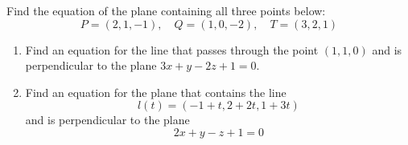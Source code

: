 \documentclass[openany]{book}
\begin{document}
\begin{prob}
    Find the equation of the plane containing all three points below:
    \begin{equation*}
        P=(2,1,-1), \quad Q=(1,0,-2), \quad T=(3,2,1)
    \end{equation*}
\end{prob}
\newpage
\begin{prob}
    \begin{enumerate}
        \item[(a)] Find an equation for the line that passes through the point $(1,1,0)$ and is perpendicular to the plane $3x+y-2z+1=0$.
        \item[(b)] Find an equation for the plane that contains the line 
        \begin{equation*}
            l(t)=(-1+t, 2+2t, 1+3t)
        \end{equation*}
        and is perpendicular to the plane 
        \begin{equation*}
            2x+y-z+1=0
        \end{equation*}
    \end{enumerate}
\end{prob}
\newpage
\end{document}
